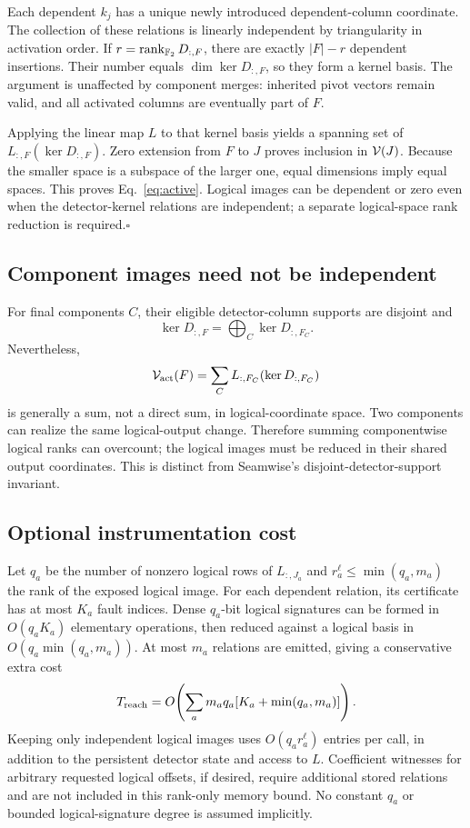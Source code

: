 Each dependent $k_j$ has a unique newly introduced dependent-column coordinate. The collection of these relations is linearly independent by triangularity in activation order. If $r=\operatorname{rank}_{\mathbb F_2} D_{:,F}$, there are exactly $|F|-r$ dependent insertions. Their number equals $\dim\ker D_{:,F}$, so they form a kernel basis. The argument is unaffected by component merges: inherited pivot vectors remain valid, and all activated columns are eventually part of $F$.

Applying the linear map $L$ to that kernel basis yields a spanning set of $L_{:,F}(\ker D_{:,F})$. Zero extension from $F$ to $J$ proves inclusion in $\mathcal V(J)$. Because the smaller space is a subspace of the larger one, equal dimensions imply equal spaces. This proves Eq.~\eqref{eq:active}. Logical images can be dependent or zero even when the detector-kernel relations are independent; a separate logical-space rank reduction is required.\hfill$\square$

\subsection{Component images need not be independent}
For final components $C$, their eligible detector-column supports are disjoint and
\[\ker D_{:,F}=\bigoplus_C\ker D_{:,F_C}.\]
Nevertheless,
\[\mathcal V_{\rm act}(F)=\sum_C L_{:,F_C}(\ker D_{:,F_C})\]
is generally a sum, not a direct sum, in logical-coordinate space. Two components can realize the same logical-output change. Therefore summing componentwise logical ranks can overcount; the logical images must be reduced in their shared output coordinates. This is distinct from Seamwise's disjoint-detector-support invariant.

\subsection{Optional instrumentation cost}
Let $q_a$ be the number of nonzero logical rows of $L_{:,J_a}$ and $r_a^{\ell}\le\min(q_a,m_a)$ the rank of the exposed logical image. For each dependent relation, its certificate has at most $K_a$ fault indices. Dense $q_a$-bit logical signatures can be formed in $O(q_aK_a)$ elementary operations, then reduced against a logical basis in $O(q_a\min(q_a,m_a))$. At most $m_a$ relations are emitted, giving a conservative extra cost
\begin{equation}
T_{\rm reach}=O\!\left(\sum_a m_aq_a[K_a+\min(q_a,m_a)]\right).\label{eq:reachcost}
\end{equation}
Keeping only independent logical images uses $O(q_ar_a^{\ell})$ entries per call, in addition to the persistent detector state and access to $L$. Coefficient witnesses for arbitrary requested logical offsets, if desired, require additional stored relations and are not included in this rank-only memory bound. No constant $q_a$ or bounded logical-signature degree is assumed implicitly.

